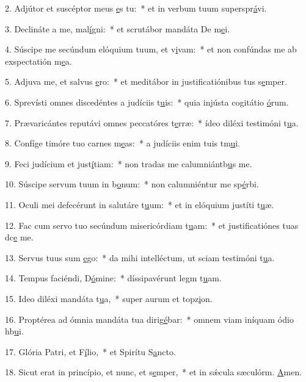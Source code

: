 2. Adjútor et suscéptor meus \uline{e}s tu:~* et in verbum tuum superspr\uline{á}vi.\par 
3. Declináte a me, mal\uline{í}gni:~* et scrutábor mandáta De m\uline{e}i.\par 
4. Súscipe me secúndum elóquium tuum, et v\uline{i}vam:~* et non confúndas me ab exspectatión m\uline{e}a.\par 
5. Adjuva me, et salvus \uline{e}ro:~* et meditábor in justificatiónibus tus s\uline{e}mper.\par 
6. Sprevísti omnes discedéntes a judíciis t\uline{u}is:~* quia injústa cogitátio \uline{ó}rum.\par 
7. Prævaricántes reputávi omnes peccatóres t\uline{e}rræ:~* ídeo diléxi testimóni t\uline{u}a.\par 
8. Confíge timóre tuo carnes m\uline{e}as:~* a judíciis enim tuis tm\uline{u}i.\par 
9. Feci judícium et just\uline{í}tiam:~* non tradas me calumniántb\uline{u}s me.\par 
10. Súscipe servum tuum in b\uline{o}num:~* non calumniéntur me sp\uline{é}rbi.\par 
11. Oculi mei defecérunt in salutáre t\uline{u}um:~* et in elóquium justíti t\uline{u}æ.\par 
12. Fac cum servo tuo secúndum misericórdiam t\uline{u}am:~* et justificatiónes tuas dc\uline{e} me.\par 
13. Servus tuus sum \uline{e}go:~* da mihi intelléctum, ut sciam testimóni t\uline{u}a.\par 
14. Tempus faciéndi, D\uline{ó}mine:~* díssipavérunt legm t\uline{u}am.\par 
15. Ideo diléxi mandáta t\uline{u}a,~* super aurum et topz\uline{i}on.\par 
16. Proptérea ad ómnia mandáta tua dirig\uline{é}bar:~* omnem viam iníquam ódio hb\uline{u}i.\par 
17. Glória Patri, et F\uline{í}lio,~* et Spirítu S\uline{a}ncto.\par 
18. Sicut erat in princípio, et nunc, et s\uline{e}mper,~* et in sǽcula sæculórm. \uline{A}men.\par 
